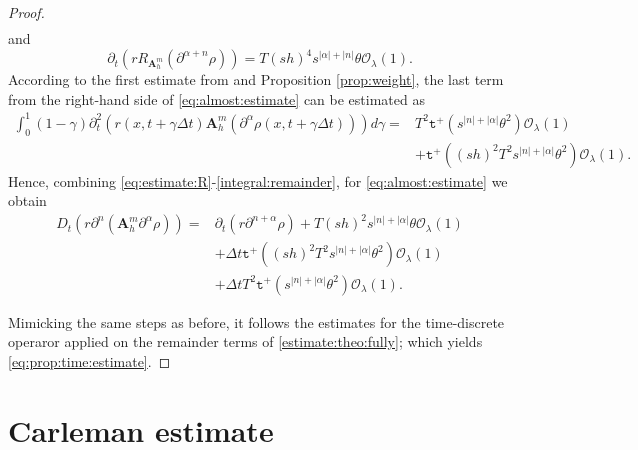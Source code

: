 \documentclass[11pt,oneside,leqno]{amsart}
\numberwithin{equation}{section}
\numberwithin{equation}{section}
\newcommand{\trp}{\mathtt t^+}
\begin{document}
\begin{proof}
\begin{equation}
\begin{aligned}
\end{aligned}
\end{equation}
and 
\begin{equation}\label{eq:estimate:R:01}
\partial_{t}(rR_{\mathbf{A}_{h}^{m}}(\partial^{\alpha+n}\rho))=T(sh)^{4}s^{|\alpha|+|n|}\theta\mathcal{O}_{\lambda}(1).
\end{equation}
According to the first estimate from \cite[Lemma A.16]{GC-HS-2021} and Proposition \ref{prop:weight}, the last term from the right-hand side of \eqref{eq:almost:estimate} can be estimated as
\begin{equation}\label{integral:remainder}
\begin{split}
    \int_{0}^{1}(1-\gamma)\partial_{t}^{2}\left( r(x,t+\gamma\Delta t)\mathbf{A}_{h}^{m}(\partial^{\alpha}\rho(x,t+\gamma\Delta t))\right)d\gamma=& T^{2}\trp(s^{|n|+|\alpha|}\theta^{2})\mathcal{O}_{\lambda}(1)\\
    &+ \trp((sh)^{2}T^{2}s^{|n|+|\alpha|}\theta^{2})\mathcal{O}_{\lambda}(1).
    \end{split}
\end{equation}
Hence, combining \eqref{eq:estimate:R}-\eqref{integral:remainder}, for \eqref{eq:almost:estimate} we obtain 
\begin{equation}
\begin{aligned}
    D_{t}(r\partial^{n}(\mathbf{A}_{h}^{m}\partial^{\alpha}\rho))=&\partial_{t}(r\partial^{n+\alpha}\rho)+T(sh)^{2}s^{|n|+|\alpha|}\theta\mathcal{O}_{\lambda}(1)\\
    &+\Delta t \trp((sh)^{2}T^{2}s^{|n|+|\alpha|}\theta^{2})\mathcal{O}_{\lambda}(1)\\
    &+\Delta t T^{2}\trp(s^{|n|+|\alpha|}\theta^{2})\mathcal{O}_{\lambda}(1).
    \end{aligned}
\end{equation}

Mimicking the same steps as before, it follows the estimates for the time-discrete operaror applied on the remainder terms of \eqref{estimate:theo:fully}; which yields \eqref{eq:prop:time:estimate}. 
\end{proof}

\section{Carleman estimate}\label{sec:Carleman}

\end{document}
